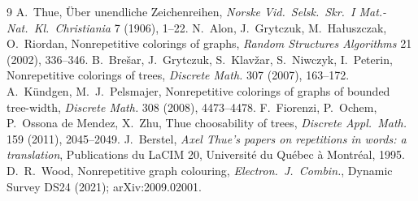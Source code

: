 \documentclass[11pt]{article}
\theoremstyle{definition}
\theoremstyle{remark}
\begin{document}
\begin{thebibliography}{9}
 A.~Thue, \"Uber unendliche Zeichenreihen, \emph{Norske Vid.\ Selsk.\ Skr.\ I
Mat.-Nat.\ Kl.\ Christiania} 7 (1906), 1--22.
 N.~Alon, J.~Grytczuk, M.~Ha{\l}uszczak, O.~Riordan, Nonrepetitive colorings of
graphs, \emph{Random Structures Algorithms} 21 (2002), 336--346.
 B.~Bre\v{s}ar, J.~Grytczuk, S.~Klav\v{z}ar, S.~Niwczyk, I.~Peterin,
Nonrepetitive colorings of trees, \emph{Discrete Math.} 307 (2007), 163--172.
 A.~K\"undgen, M.~J.~Pelsmajer, Nonrepetitive colorings of graphs of bounded
tree-width, \emph{Discrete Math.} 308 (2008), 4473--4478.
 F.~Fiorenzi, P.~Ochem, P.~Ossona de Mendez, X.~Zhu, Thue choosability of trees,
\emph{Discrete Appl.\ Math.} 159 (2011), 2045--2049.
 J.~Berstel, \emph{Axel Thue's papers on repetitions in words: a
translation}, Publications du LaCIM 20, Universit\'e du Qu\'ebec \`a Montr\'eal, 1995.
 D.~R.~Wood, Nonrepetitive graph colouring, \emph{Electron.\ J.\ Combin.}, Dynamic
Survey DS24 (2021); arXiv:2009.02001.
\end{thebibliography}
\end{document}
